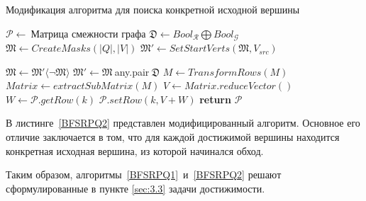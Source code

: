\begin{algorithm}[t]
  \caption{Модификация алгоритма для поиска конкретной исходной вершины}\label{BFSRPQ2}
  \begin{algorithmic}[1]
    \State $\mathcal{P}\gets~${Матрица смежности графа}
    \State $\mathfrak{D}\gets Bool_\mathcal{R} \bigoplus Bool_\mathcal{G}$
    \State $\mathfrak{M}\gets CreateMasks(|Q|,|V|)$
    \State $\mathfrak{M}'\gets SetStartVerts(\mathfrak{M}, V_{src})$  
    
      \State $\mathfrak{M}\gets \mathfrak{M}'\langle\neg\mathfrak{M}\rangle$
        \State $\mathfrak{M}'\gets \mathfrak{M}~$any.pair$~\mathfrak{D}$
            \State $M\gets TransformRows(M)$
        \EndFor
      \EndFor
        \State $Matrix\gets extractSubMatrix(M)$
        \State $V\gets Matrix.reduceVector()$
        \State $W\gets\mathcal{P}.getRow(k)$
        \State $\mathcal{P}.setRow(k, V+W)$
      \EndFor
    \EndWhile
    \State \textbf{return} $\mathcal{P}$
    \EndProcedure
  \end{algorithmic}
\end{algorithm}

В листинге~\ref{BFSRPQ2} представлен модифицированный алгоритм. Основное его отличие заключается в том, что для каждой достижимой вершины находится конкретная исходная вершина, из которой начинался обход.

Таким образом, алгоритмы~\ref{BFSRPQ1}~и~\ref{BFSRPQ2} решают сформулированные в пункте \ref{sec:3.3} задачи достижимости.

